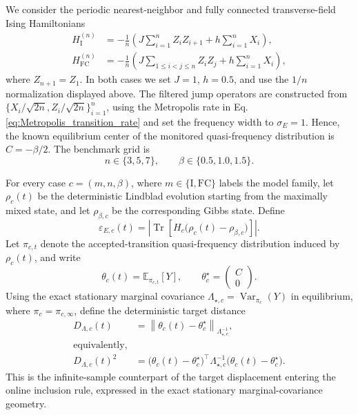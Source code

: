 \documentclass[showpacs,amsmath,amssymb,twocolumn,prx,superscriptaddress,10pt,aps,nofootinbib]{revtex4-2}
\begin{document}
We consider the periodic nearest-neighbor and fully connected transverse-field Ising Hamiltonians
\begin{align}
    H_{\mathrm{I}}^{(n)}
    &=
    -\frac{1}{n}
    \left(
        J\sum_{i=1}^{n}Z_iZ_{i+1}
        +
        h\sum_{i=1}^{n}X_i
    \right),
    \label{eq:benchmark_ising}
    \\
    H_{\mathrm{FC}}^{(n)}
    &=
    -\frac{1}{n}
    \left(
        J\sum_{1\leq i<j\leq n}Z_iZ_j
        +
        h\sum_{i=1}^{n}X_i
    \right),
    \label{eq:benchmark_fcising}
\end{align}
where $Z_{n+1}=Z_1$. In both cases we set $J=1$, $h=0.5$, and use the $1/n$ normalization displayed above. The filtered jump operators are constructed from $\{X_i/\sqrt{2n},Z_i/\sqrt{2n}\}_{i=1}^n$, using the Metropolis rate in Eq. \eqref{eq:Metropolis_transition_rate} and set the frequency width to $\sigma_E=1$. Hence, the known equilibrium center of the monitored quasi-frequency distribution is $C=-\beta/2$. The benchmark grid is
\begin{equation}
    n\in\{3,5,7\},
    \qquad
    \beta\in\{0.5,1.0,1.5\}.
    \label{eq:benchmark_grid}
\end{equation}

For every case $c=(m,n,\beta)$, where $m \in \{ \text{I}, \text{FC}\}$ labels the model family, let $\rho_c(t)$ be the deterministic Lindblad evolution starting from the maximally mixed state, and let $\rho_{\beta,c}$ be the corresponding Gibbs state. Define
\begin{equation}
    \varepsilon_{E,c}(t)
    =
    \left|
        \operatorname{Tr}
        \left[
            H_c\bigl(\rho_c(t)-\rho_{\beta,c}\bigr)
        \right]
    \right|.
    \label{eq:energy_error}
\end{equation}
Let $\pi_{c,t}$ denote the accepted-transition quasi-frequency distribution induced by $\rho_c(t)$, and write
\begin{equation}
    \theta_c(t)=\mathbb{E}_{\pi_{c,t}}[Y],
    \qquad
    \theta_c^\star=
    \begin{pmatrix}
        C\\
        0
    \end{pmatrix}.
\end{equation}
Using the exact stationary marginal covariance $\Lambda_{\star,c}=\operatorname{Var}_{\pi_c}(Y)$ in equilibrium, where $\pi_c=\pi_{c,\infty}$, define the deterministic target distance
\begin{align}
    D_{\Lambda,c}(t)
    &=
    \left\|
        \theta_c(t)-\theta_c^\star
    \right\|_{\Lambda_{\star,c}^{-1}},
    \nonumber\\
    \text{equivalently,} \nonumber \\
    D_{\Lambda,c}(t)^2
    &=
    \bigl(\theta_c(t)-\theta_c^\star\bigr)^\top
    \Lambda_{\star,c}^{-1}
    \bigl(\theta_c(t)-\theta_c^\star\bigr).
    \label{eq:deterministic_target_distance}
\end{align}
This is the infinite-sample counterpart of the target displacement entering the online inclusion rule, expressed in the exact stationary marginal-covariance geometry. 
\end{document}
